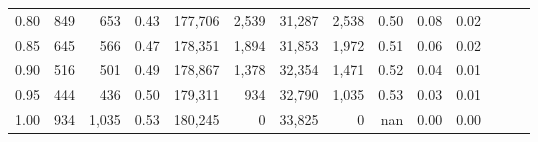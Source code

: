 \begin{tabular}{rrrrrrrrrrrrrr}
0.80 &     849 &    653 &  0.43 &  177,706 &    2,539 &  31,287 &   2,538 &  0.50 &  0.08 &      0.02 \\
0.85 &     645 &    566 &  0.47 &  178,351 &    1,894 &  31,853 &   1,972 &  0.51 &  0.06 &      0.02 \\
0.90 &     516 &    501 &  0.49 &  178,867 &    1,378 &  32,354 &   1,471 &  0.52 &  0.04 &      0.01 \\
0.95 &     444 &    436 &  0.50 &  179,311 &      934 &  32,790 &   1,035 &  0.53 &  0.03 &      0.01 \\
1.00 &     934 &  1,035 &  0.53 &  180,245 &        0 &  33,825 &       0 &   nan &  0.00 &      0.00 \\
\bottomrule
\end{tabular}
